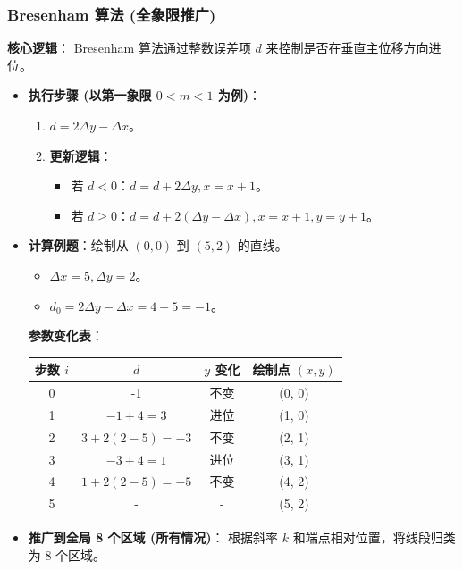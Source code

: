 \documentclass[UTF8]{ctexart}
\begin{document}
\subsubsection{Bresenham 算法 (全象限推广)}
\textbf{核心逻辑}：
Bresenham 算法通过整数误差项 $d$ 来控制是否在垂直主位移方向进位。
\begin{itemize}
    \item \textbf{执行步骤 (以第一象限 $0 < m < 1$ 为例)}：
        \begin{enumerate}
            \item $d = 2\Delta y - \Delta x$。
            \item \textbf{更新逻辑}：
                \begin{itemize}
                    \item 若 $d < 0$：$d = d + 2\Delta y, x = x + 1$。
                    \item 若 $d \ge 0$：$d = d + 2(\Delta y - \Delta x), x = x + 1, y = y + 1$。
                \end{itemize}
        \end{enumerate}
    \item \textbf{计算例题}：绘制从 $(0,0)$ 到 $(5,2)$ 的直线。
        \begin{itemize}
            \item $\Delta x = 5, \Delta y = 2$。
            \item $d_0 = 2\Delta y - \Delta x = 4 - 5 = -1$。
        \end{itemize}
        \textbf{参数变化表}：
        \begin{center}
        \begin{tabular}{|c|c|c|c|}
            \hline
            步数 $i$ & $d$ & $y$ 变化 & 绘制点 $(x, y)$ \\
            \hline
            0 & -1 & 不变 & (0, 0) \\
            1 & $-1+4=3$ & 进位 & (1, 0) \\
            2 & $3+2(2-5)=-3$ & 不变 & (2, 1) \\
            3 & $-3+4=1$ & 进位 & (3, 1) \\
            4 & $1+2(2-5)=-5$ & 不变 & (4, 2) \\
            5 & - & - & (5, 2) \\
            \hline
        \end{tabular}
        \end{center}
    \item \textbf{推广到全局 8 个区域 (所有情况)}：
        根据斜率 $k$ 和端点相对位置，将线段归类为 8 个区域。

\end{itemize}
\end{document}

